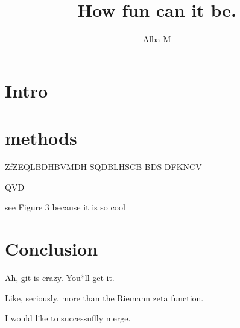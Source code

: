 \documentclass{article}
\author{Alba M}
\title{How fun can it be.}
\begin{document}
	\maketitle
	\section{Intro}
	\section{methods}
	ZfZEQLBDHBVMDH
	SQDBLHSCB
	BDS
	DFKNCV
	
	QVD
	
	see Figure 3 because it is so cool
	
	\section{Conclusion}
	Ah, git is crazy. You*ll get it.
	
	Like, seriously, more than the Riemann zeta function.
	
	I would like to successuflly merge.
	
\end{document}
